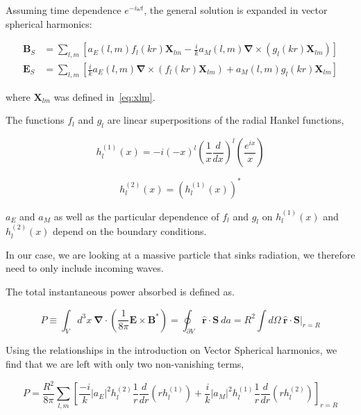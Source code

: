 \documentclass {article}
\renewcommand\vec{\mathbf}
\let\OldS\nabla
\renewcommand{\nabla}{\boldsymbol{\OldS}}
\let\OldHat\hat
\renewcommand{\hat}[1]{\OldHat{\mathbf{#1}}}
\begin{document}
Assuming time dependence \( e^{-i \omega t} \), the general solution is expanded in vector spherical harmonics:

\begin{equation}
\begin{aligned}
\vec{B}_S &= \sum_{l,m} \left[
a_E(l,m) f_l(kr) \vec{X}_{lm}
- \frac{i}{k} a_M(l,m) \nabla \times \left( g_l(kr) \vec{X}_{lm} \right)
\right] \\
\vec{E}_S &= \sum_{l,m} \left[
\frac{i}{k} a_E(l,m) \nabla \times \left( f_l(kr) \vec{X}_{lm} \right)
+ a_M(l,m) g_l(kr) \vec{X}_{lm}
\right]
\end{aligned}
\end{equation}

where \(\vec{X}_{lm}\) was defined in~\eqref{eq:xlm}.



The functions $f_l$ and $g_l$ are linear superpositions of the radial Hankel functions,

\begin{equation}
h_l^{(1)}(x) = -i (-x)^l \left(\frac 1 x \frac d {dx} \right)^l \left(\frac {e^{ix}} x \right)
\end{equation}

\begin{equation}
h_l^{(2)}(x) = \left( h_l^{(1)}(x) \right)^*
\end{equation}

\noindent $a_E$ and $a_M$ as well as the particular dependence of $f_l$ and $g_l$ on $h_l^{(1)}(x) $ and $h_l^{(2)}(x) $ depend on the boundary conditions.

In our case, we are looking at a massive particle that sinks radiation, we therefore need to only include incoming waves.

The total instantaneous power absorbed is defined as.

\begin{equation}
P \equiv \int_V d^3x ~ \nabla \cdot \left( \frac 1 {8 \pi} \vec E \times \vec B^*\right) = \oint_{\partial V} \hat r \cdot \vec S ~ da = R^2 \int d\Omega ~ \hat r \cdot \vec S \bigg|_{r = R}
\end{equation}

Using the relationships in the introduction on Vector Spherical harmonics, we find that we are left with only two non-vanishing terms,

\begin{equation}
P = \frac {R^2}{8 \pi} \sum_{l, m} \left[  \frac {-i} k |a_E|^2 h_l^{(2)} \frac 1 r \frac d {dr} \left( rh_l^{(1)} \right) + \frac i k |a_M|^2 h_l^{(1)} \frac 1 r \frac d {dr} \left( rh_l^{(2)}\right) \right]_{r=R}
\end{equation}
\end{document}
